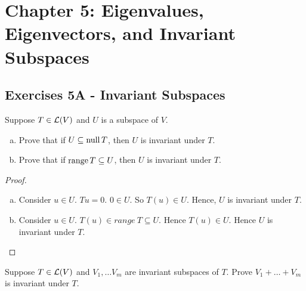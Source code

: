 \section*{Chapter 5: Eigenvalues, Eigenvectors, and Invariant Subspaces}

\subsection*{Exercises 5A - Invariant Subspaces}


\begin{problem}{1}
Suppose $T\in\mathcal{L}(V)$ and $U$ is a subspace of $V$.
\begin{enumerate}[(a)]
\item Prove that if $U\subseteq \operatorname{null} T$, then $U$ is invariant under $T$.
\item Prove that if $\operatorname{range} T\subseteq U$, then $U$ is invariant under $T$.
\end{enumerate}
\end{problem}
\begin{proof}

\begin{enumerate}[(a)]
\item Consider $u \in U$. $Tu = 0$. $0 \in U$. So $T(u) \in U$. Hence, $U$ is invariant under $T$.
\item Consider $u \in U$. $T(u) \in range\ T \subseteq U$. Hence $T(u) \in U$. Hence $U$ is invariant under $T$.  \qedhere
\end{enumerate}


\end{proof}


\begin{problem}{2}
Suppose $T\in\mathcal{L}(V)$ and $V_1, \ldots V_m$ are invariant subspaces of $T$. Prove $V_1 + \ldots + V_m$ is invariant under $T$.
\end{problem}
